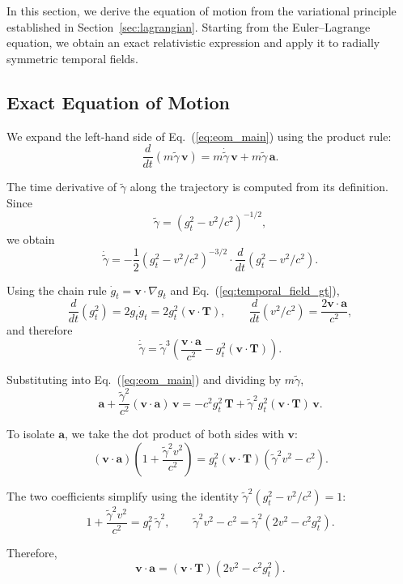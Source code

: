 \documentclass[12pt]{article}
\begin{document}
In this section, we derive the equation of motion from the variational principle established in Section~\ref{sec:lagrangian}. Starting from the Euler--Lagrange equation, we obtain an exact relativistic expression and apply it to radially symmetric temporal fields.

\subsection{Exact Equation of Motion}
\label{sec:exact_eom}

We expand the left-hand side of Eq.~(\ref{eq:eom_main}) using the product rule:
$$
\frac{d}{dt}(m \tilde{\gamma}\,\mathbf{v})
= m \dot{\tilde{\gamma}}\,\mathbf{v}
+ m \tilde{\gamma}\,\mathbf{a} .
$$

The time derivative of $\tilde{\gamma}$ along the trajectory is computed from its definition. Since
$$
\tilde{\gamma} = (g_t^2 - v^2/c^2)^{-1/2} ,
$$
we obtain
$$
\dot{\tilde{\gamma}} = -\frac{1}{2}(g_t^2 - v^2/c^2)^{-3/2}
\cdot \frac{d}{dt}(g_t^2 - v^2/c^2) .
$$

Using the chain rule $\dot{g}_t = \mathbf{v}\cdot\nabla g_t$ and Eq.~(\ref{eq:temporal_field_gt}),
$$
\frac{d}{dt}(g_t^2) = 2g_t\dot{g}_t = 2g_t^2(\mathbf{v}\cdot\mathbf{T}) ,
\qquad
\frac{d}{dt}(v^2/c^2) = \frac{2\mathbf{v}\cdot\mathbf{a}}{c^2} ,
$$
and therefore
$$
\dot{\tilde{\gamma}}
= \tilde{\gamma}^3\left(\frac{\mathbf{v}\cdot\mathbf{a}}{c^2}
  - g_t^2(\mathbf{v}\cdot\mathbf{T})\right) .
$$

Substituting into Eq.~(\ref{eq:eom_main}) and dividing by $m\tilde{\gamma}$,
\begin{equation}
\mathbf{a}
+ \frac{\tilde{\gamma}^2}{c^2}(\mathbf{v}\cdot\mathbf{a})\,\mathbf{v}
= -c^2 g_t^2\,\mathbf{T}
  + \tilde{\gamma}^2 g_t^2(\mathbf{v}\cdot\mathbf{T})\,\mathbf{v} .
\label{eq:rel_implicit}
\end{equation}

To isolate $\mathbf{a}$, we take the dot product of both sides with $\mathbf{v}$:
$$
(\mathbf{v}\cdot\mathbf{a})\!\left(1 + \frac{\tilde{\gamma}^2 v^2}{c^2}\right)
= g_t^2(\mathbf{v}\cdot\mathbf{T})
  \left(\tilde{\gamma}^2 v^2 - c^2\right) .
$$

The two coefficients simplify using the identity $\tilde{\gamma}^2(g_t^2 - v^2/c^2) = 1$:
$$
1 + \frac{\tilde{\gamma}^2 v^2}{c^2} = g_t^2\,\tilde{\gamma}^2,
\qquad
\tilde{\gamma}^2 v^2 - c^2
= \tilde{\gamma}^2(2v^2 - c^2 g_t^2) .
$$

Therefore,
$$
\mathbf{v}\cdot\mathbf{a}
= (\mathbf{v}\cdot\mathbf{T})(2v^2 - c^2 g_t^2) .
$$
\end{document}
